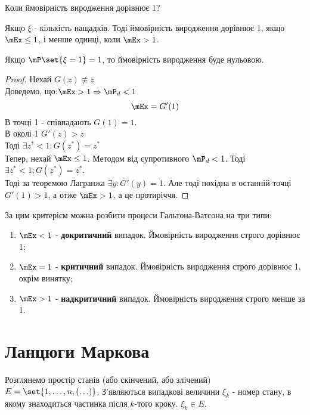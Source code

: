 Коли ймовірність виродження дорівнює 1?\\
\begin{teor}
Якщо $\xi$ - кількість нащадків. Тоді ймовірність виродження дорівнює 1, якщо $\mEx\leq1$, і менше одинці, коли $\mEx>1$.
\end{teor}
\begin{nasl}[Виняток]
Якщо $\mP\set{\xi=1}=1$, то ймовірність виродження буде нульовою.
\end{nasl}
\begin{proof}
Нехай $G(z)\not\equiv z$\\
Доведемо, що:$\mEx>1\Rightarrow \mP_{d}<1$
\begin{equation}
\mEx = G'(1)
\end{equation}
В точці 1 - співпадають $G(1)=1$.\\
В околі 1 $G'(z)>z$\\
Тоді $\exists z^*<1:G(z^*) = z^*$\\
Тепер, нехай $\mEx\leq 1$. Методом від супротивного $\mP_d<1$. Тоді $\exists z^*<1;G(z^*)=z^*$.\\
Тоді за теоремою Лагранжа $\exists y: G'(y)=1$. Але тоді похідна в останній точці $G'(1)>1$, а отже $\mEx>1$, а це протиріччя.
\end{proof}
\noindent За цим критерієм можна розбити процеси Гальтона-Ватсона на три типи:
\begin{enumerate}
\item $\mEx<1$ - \textbf{докритичний} випадок. Ймовірність виродження строго дорівнює 1;
\item $\mEx=1$ - \textbf{критичний} випадок. Ймовірність виродження строго дорівнює 1, окрім винятку;
\item $\mEx>1$ - \textbf{надкритичний} випадок. Ймовірність виродження строго менше за 1.
\end{enumerate}
\section{Ланцюги Маркова}
Розглянемо простір станів (або скінчений, або злічений) $E=\set{1,\ldots,n,(\ldots)}$. З’являються випадкові величини $\xi_k$ - номер стану, в якому знаходиться частинка після $k$-того кроку. $\xi_k\in E$.
